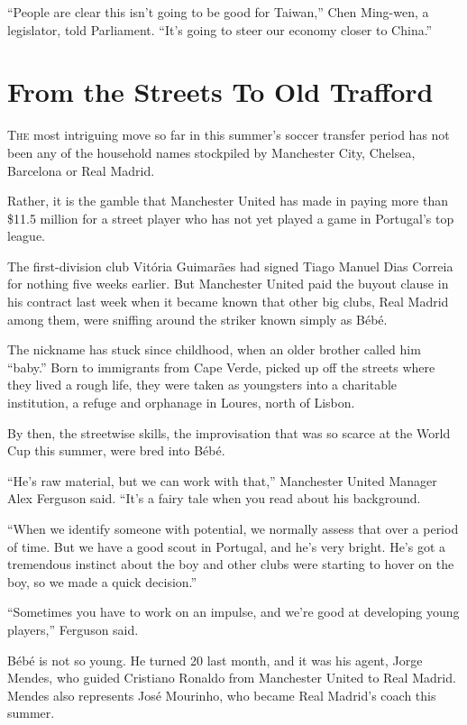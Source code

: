 ﻿\documentclass[12pt]{article}
\begin{document}
``People are clear this isn't going to be good for Taiwan,'' Chen Ming-wen, a legislator, told
Parliament. ``It's going to steer our economy closer to China.''

\section{From the Streets To Old Trafford}

\lettrine{T}{he} most intriguing move so far in this summer's soccer
transfer period has not been any of the household names stockpiled by Manchester City, Chelsea,
Barcelona or Real Madrid.

Rather, it is the gamble that Manchester United has made in paying more than \$11.5 million for a
street player who has not yet played a game in Portugal's top league.

The first-division club Vit\'oria Guimarães had signed Tiago Manuel Dias Correia for nothing five
weeks earlier. But Manchester United paid the buyout clause in his contract last week when it became
known that other big clubs, Real Madrid among them, were sniffing around the striker known simply as
B\'eb\'e.

The nickname has stuck since childhood, when an older brother called him ``baby.'' Born to
immigrants from Cape Verde, picked up off the streets where they lived a rough life, they were taken
as youngsters into a charitable institution, a refuge and orphanage in Loures, north of Lisbon.

By then, the streetwise skills, the improvisation that was so scarce at the World Cup this summer,
were bred into B\'eb\'e.

``He's raw material, but we can work with that,'' Manchester United Manager Alex Ferguson said.
``It's a fairy tale when you read about his background.

``When we identify someone with potential, we normally assess that over a period of time. But we
have a good scout in Portugal, and he's very bright. He's got a tremendous instinct about the boy
and other clubs were starting to hover on the boy, so we made a quick decision.''

``Sometimes you have to work on an impulse, and we're good at developing young players,'' Ferguson
said.

B\'eb\'e is not so young. He turned 20 last month, and it was his agent, Jorge Mendes, who guided
Cristiano Ronaldo from Manchester United to Real Madrid. Mendes also represents Jos\'e Mourinho, who
became Real Madrid's coach this summer.
\end{document}
